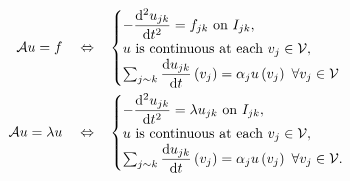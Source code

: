 \begin{align*}
	\mathcal{A}u = f \quad\Leftrightarrow\quad &
	\begin{cases}
		-\dfrac{\mathrm{d}^2 u_{jk}}{\mathrm{d} {t}^2} = f_{jk} \ \text{on } I_{jk}, \\
		u \text{ is continuous at each } v_j\in \mathcal{V}, \\
		\sum_{j\sim k}\dfrac{\mathrm{d}u_{jk}}{\mathrm{d}t}\left( v_j \right) = \alpha_j u\left( v_j \right) \ \forall v_j\in \mathcal{V}
	\end{cases} \\
	\mathcal{A}u = \lambda u \quad\Leftrightarrow\quad &
	\begin{cases}
		-\dfrac{\mathrm{d}^2 u_{jk}}{\mathrm{d} {t}^2} = \lambda u_{jk} \ \text{on } I_{jk}, \\
		u \text{ is continuous at each } v_j\in \mathcal{V}, \\
		\sum_{j\sim k}\dfrac{\mathrm{d}u_{jk}}{\mathrm{d}t}\left( v_j \right) = \alpha_j u\left( v_j \right) \ \forall v_j\in \mathcal{V}.
	\end{cases}
\end{align*}

